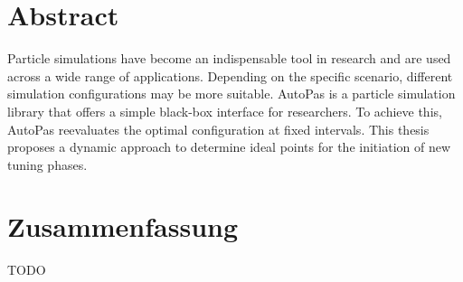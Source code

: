 \thispagestyle{plain}

\chapter*{Abstract}

Particle simulations have become an indispensable tool in research and are used across a wide range of applications. Depending on the specific scenario, different simulation configurations may be more suitable. AutoPas is a particle simulation library that offers a simple black-box interface for researchers. To achieve this, AutoPas reevaluates the optimal configuration at fixed intervals. This thesis proposes a dynamic approach to determine ideal points for the initiation of new tuning phases.


\MediaOptionLogicBlank

\chapter*{Zusammenfassung}

TODO

\MediaOptionLogicBlank